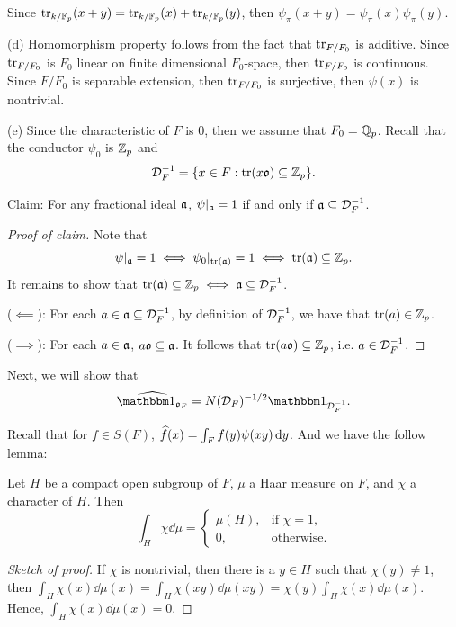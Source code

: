\begin{solution}
Since $\operatorname{tr}_{k/\mathbb{F}_p}(x + y) = \operatorname{tr}_{k/ \mathbb{F}_p}(x) + \operatorname{tr}_{k/ \mathbb{F}_p}(y)$, then
$\psi_\pi(x + y) = \psi_\pi(x) \psi_\pi(y)$.

(d) Homomorphism property follows from the fact that $\operatorname{tr}_{F/F_0}$ is additive. Since $\operatorname{tr}_{F/F_0}$
is $F_0$ linear on finite dimensional $F_0$-space, then $\operatorname{tr}_{F/F_0}$ is continuous.
Since $F/ F_0$ is separable extension, then $\operatorname{tr}_{F/F_0}$ is surjective, then $\psi(x)$ is nontrivial.

(e) Since the characteristic of $F$ is $0$, then we assume that $F_0= \mathbb{Q}_p$.
Recall that the conductor $\psi_0$ is $\mathbb{Z}_p$ and
\[\mathcal{D}_F ^{-1} = \{x \in F: \operatorname{tr}(x \mathfrak{o}) \subseteq \mathbb{Z}_p\}.\]

Claim: For any fractional ideal $\mathfrak{a}$, $\psi|_{\mathfrak{a}} = 1$ if and only if $\mathfrak{a} \subseteq \mathcal{D}_F^{-1}$.

\begin{proof}[Proof of claim]
Note that
\[\psi|_{\mathfrak{a}} = 1 \iff \psi_0|_{\operatorname{tr}(\mathfrak{a})} = 1 \iff \operatorname{tr}(\mathfrak{a}) \subseteq \mathbb{Z}_p. \]
It remains to show that $\operatorname{tr}(\mathfrak{a}) \subseteq \mathbb{Z}_p \iff \mathfrak{a} \subseteq \mathcal{D}_F^{-1}$.

($\impliedby$): For each $a \in \mathfrak{a} \subseteq \mathcal{D}_F^{-1}$, by definition of $\mathcal{D}_F^{-1}$,
we have that $\operatorname{tr}(a) \in \mathbb{Z}_p$.

($\implies$): For each $a \in \mathfrak{a}$, $a \mathfrak{o} \subseteq \mathfrak{a}$. It follows that
$\operatorname{tr}(a\mathfrak{o}) \subseteq \mathbb{Z}_p$, i.e. $a\in \mathcal{D}_F^{-1}$.
\end{proof}

Next, we will show that
\[\dual{\bbone_{\gotho_F}} = N(\calD_F)^{-1/2} \bbone_{\calD_F^{-1}}. \]

Recall that for $f \in S(F)$, $\widehat{f}(x) = \int_{F} f(y) \psi(x y) \mathop{}\!\mathrm{d} y$. And we have
the follow lemma:

\begin{lemma}
  Let $H$ be a compact open subgroup of $F$, $\mu$ a Haar measure on $F$, and $\chi$ a
  character of $H$. Then
  \[\int_{H} \chi \dd\mu =
    \begin{cases}
      \mu(H), & \text{if } \chi = 1, \\
      0, & \text{otherwise}.
    \end{cases}
  \]
\end{lemma}

\begin{proof}[Sketch of proof]
If $\chi$ is nontrivial, then there is a $y \in H$ such that
$\chi(y) \neq 1$, then $\int_{H} \chi (x) \dd\mu(x) =
\int_{H} \chi(xy) \dd \mu(x y) = \chi(y)\int_{H} \chi (x) \dd\mu(x) $.
Hence, $\int_{H} \chi (x) \dd\mu(x) = 0$.
\end{proof}


\end{solution}

